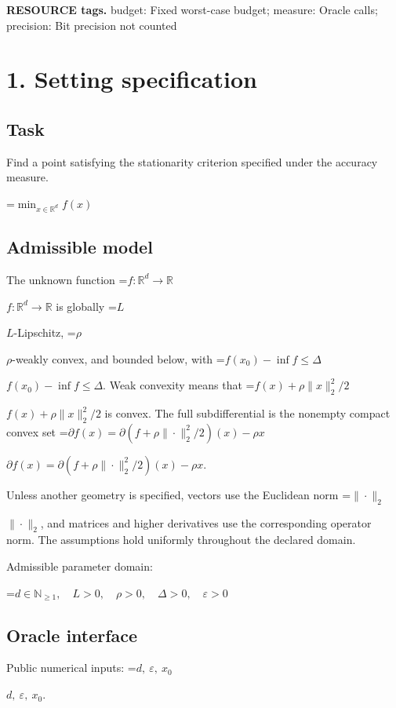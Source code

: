 \documentclass[10pt,a4paper]{article}
\newcommand{\AtlasMath}[1]{\par\begingroup\centering\setbox0=\hbox{$\displaystyle #1$}\ifdim\wd0>1.4\linewidth\typeout{ATLAS WIDE FORMULA: \the\wd0}\fi\ifdim\wd0>\linewidth\resizebox{\linewidth}{!}{\box0}\else\box0\fi\par\endgroup}
\newcommand{\AtlasInlineMath}[1]{\begingroup\setbox0=\hbox{$#1$}\ifdim\wd0>.4\linewidth\endgroup\AtlasMath{#1}\else\endgroup$#1$\fi}
\begin{document}
\textbf{RESOURCE tags.} budget: Fixed worst-case budget; measure: Oracle calls; precision: Bit precision not counted



\section{1. Setting specification}


\subsection{Task}


Find a point satisfying the stationarity criterion specified under the accuracy measure.




\AtlasMath{\min_{x\in \mathbb{R}^d}f(x)}




\subsection{Admissible model}


The unknown function \AtlasInlineMath{f:\mathbb R^d\to\mathbb R} is globally \AtlasInlineMath{L}-Lipschitz, \AtlasInlineMath{\rho}-weakly convex, and bounded below, with \AtlasInlineMath{f(x_0)-\inf f\le\Delta}. Weak convexity means that \AtlasInlineMath{f(x)+\rho\|x\|_2^2/2} is convex. The full subdifferential is the nonempty compact convex set \AtlasInlineMath{\partial f(x)=\partial(f+\rho\|\cdot\|_2^2/2)(x)-\rho x}.



Unless another geometry is specified, vectors use the Euclidean norm \AtlasInlineMath{\|\cdot\|_2}, and matrices and higher derivatives use the corresponding operator norm. The assumptions hold uniformly throughout the declared domain.



Admissible parameter domain:


\AtlasMath{d\in\mathbb{N}_{\ge1},\quad L>0,\quad \rho>0,\quad \Delta>0,\quad \varepsilon>0}




\subsection{Oracle interface}


Public numerical inputs: \AtlasInlineMath{d,\ \varepsilon,\ x_0}.
\end{document}
